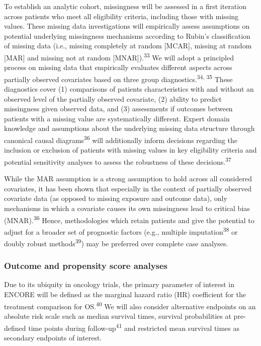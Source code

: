 \documentclass[
  letterpaper,
  DIV=11,
  numbers=noendperiod]{scrartcl}
\begin{document}
To establish an analytic cohort, missingness will be assessed in a first
iteration across patients who meet all eligibility criteria, including
those with missing values. These missing data investigations will
empirically assess assumptions on potential underlying missingness
mechanisms according to Rubin's classification of missing data (i.e.,
missing completely at random {[}MCAR{]}, missing at random {[}MAR{]} and
missing not at random {[}MNAR{]}).\textsuperscript{33} We will adopt a
principled process on missing data that empirically evaluates different
aspects across partially observed covariates based on three group
diagnostics.\textsuperscript{34, 35} These diagnostics cover (1)
comparisons of patients characteristics with and without an observed
level of the partially observed covariate, (2) ability to predict
missingness given observed data, and (3) assessments if outcomes between
patients with a missing value are systematically different. Expert
domain knowledge and assumptions about the underlying missing data
structure through canonical causal diagrams\textsuperscript{36} will
additionally inform decisions regarding the inclusion or exclusion of
patients with missing values in key eligibility criteria and potential
sensitivity analyses to assess the robustness of these
decisions.\textsuperscript{37}

While the MAR assumption is a strong assumption to hold across all
considered covariates, it has been shown that especially in the context
of partially observed covariate data (as opposed to missing exposure and
outcome data), only mechanisms in which a covariate causes its own
missingness lead to critical bias (MNAR).\textsuperscript{36} Hence,
methodologies which retain patients and give the potential to adjust for
a broader set of prognostic factors (e.g., multiple
imputation\textsuperscript{38} or doubly robust
methods\textsuperscript{39}) may be preferred over complete case
analyses.

\subsubsection{Outcome and propensity score
analyses}\label{outcome-and-propensity-score-analyses}

Due to its ubiquity in oncology trials, the primary parameter of
interest in ENCORE will be defined as the marginal hazard ratio (HR)
coefficient for the treatment comparison for OS.\textsuperscript{40} We
will also consider alternative endpoints on an absolute risk scale such
as median survival times, survival probabilities at pre-defined time
points during follow-up\textsuperscript{41} and restricted mean survival
times as secondary endpoints of interest.
\end{document}
